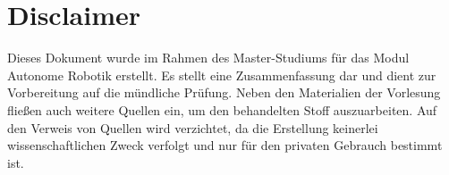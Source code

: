 \documentclass[11pt]{scrartcl}
\begin{document}











\section*{Disclaimer}
Dieses Dokument wurde im Rahmen des Master-Studiums
für das Modul \glqq Autonome Robotik\grqq{} erstellt. Es stellt eine 
Zusammenfassung dar und dient zur Vorbereitung auf die
mündliche Prüfung. Neben den Materialien der Vorlesung
fließen auch weitere Quellen ein, um den behandelten Stoff
auszuarbeiten. Auf den Verweis von Quellen wird verzichtet,
da die Erstellung keinerlei wissenschaftlichen Zweck verfolgt
und nur für den privaten Gebrauch bestimmt ist.
\end{document}

